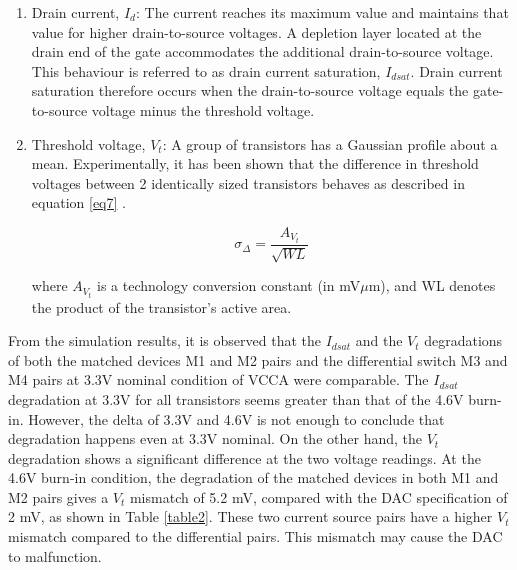 \documentclass[11pt,a4paper]{article}
\begin{document}
\begin{enumerate}
\item Drain current, $I_{d}$: The current reaches its maximum value and maintains that value for higher drain-to-source voltages. A depletion layer located at the drain end of the gate accommodates the additional drain-to-source voltage. This behaviour is referred to as drain current saturation, $I_{dsat}$. Drain current saturation therefore occurs when the drain-to-source voltage equals the gate-to-source voltage minus the threshold voltage. 
\item Threshold voltage, $V_t$: A group of transistors has a Gaussian profile about a mean. Experimentally, it has been shown that the difference in threshold voltages between 2 identically sized transistors behaves as described in equation \ref{eq7} \cite{Schroder}.

\begin{equation} 
\sigma_{\Delta} = \frac{A_{V_t}}{\sqrt{WL}}
\label{eq7}	
\end{equation}

where $A_{V_{t}}$ is a technology conversion constant (in mV$\mu$m), and WL denotes the product of the transistor's active area.

\end{enumerate}

From the simulation results, it is observed that the $I_{dsat}$ and the $V_t$ degradations of both the matched devices  M1 and M2 pairs and the differential switch M3 and M4 pairs at 3.3V nominal condition of VCCA were comparable. The $I_{dsat}$ degradation at 3.3V for all transistors seems greater than that of the 4.6V burn-in. However, the delta of 3.3V and 4.6V is not enough to conclude that degradation happens even at 3.3V nominal. On the other hand, the $V_t$ degradation shows a significant difference at the two voltage readings. At the 4.6V burn-in condition, the degradation of the matched devices  in both M1 and M2 pairs gives a $V_t$ mismatch of 5.2 mV, compared with the DAC specification of 2 mV,  as shown in Table \ref{table2}. These two current source pairs have a higher $V_t$ mismatch compared to the differential pairs. This mismatch may cause the DAC to malfunction. 
\end{document}
